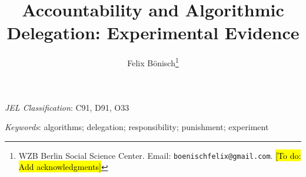 \documentclass[12pt,english]{article}
\theoremstyle{plain}
\theoremstyle{plain}
\theoremstyle{definition}
\theoremstyle{plain}
\theoremstyle{definition}
\theoremstyle{plain}
\theoremstyle{plain}
\newcounter{result}
\begin{document}
\title{Accountability and Algorithmic Delegation: Experimental Evidence}
\author{Felix B\"{o}nisch\thanks{WZB Berlin Social Science Center. Email: \texttt{boenischfelix@gmail.com}. \hl{[To do: Add acknowledgments]}}}
\maketitle


\begin{abstract}
    
\end{abstract}
\medskip{}

\noindent \textit{JEL Classification}: C91, D91, O33

\noindent \textit{Keywords}: algorithms; delegation; responsibility; punishment; experiment

\newpage{}












\pagebreak



\newpage{}

\setcounter{page}{1}
\renewcommand{\thepage}{A-\arabic{page}}


\end{document}
